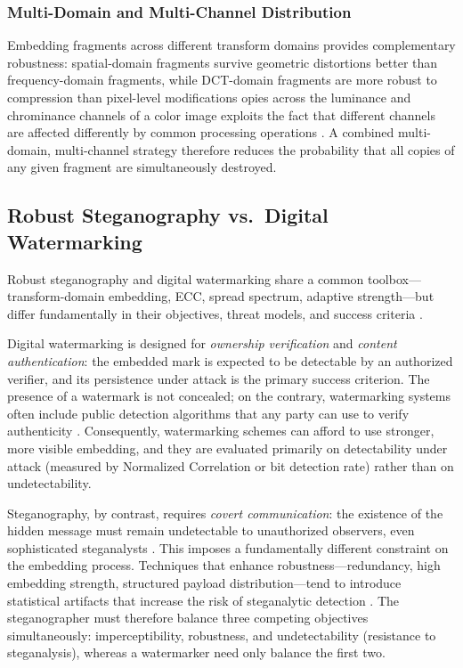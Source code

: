 \documentclass[12pt,a4paper,oneside]{report}
\begin{document}
	\subsubsection{Multi-Domain and Multi-Channel Distribution}
	
	Embedding fragments across different transform domains provides complementary robustness:
	spatial-domain fragments survive geometric distortions better than frequency-domain
	fragments, while DCT-domain fragments are more robust to compression than pixel-level
	modifications \cite{Piva2002, petitcolas1999information}opies across the luminance and chrominance channels
	of a color image exploits the fact that different channels are affected differently
	by common processing operations \cite{barni2001improved}.
	A combined multi-domain, multi-channel strategy therefore reduces the probability that
	all copies of any given fragment are simultaneously destroyed.
	
	\subsection{Robust Steganography vs.\ Digital Watermarking}
	\label{subsec:stego_vs_watermark}
	
	Robust steganography and digital watermarking share a common toolbox—transform-domain
	embedding, ECC, spread spectrum, adaptive strength—but differ fundamentally in their
	objectives, threat models, and success criteria \cite{cox2007, johnson1998steganography}.
	
	Digital watermarking is designed for \emph{ownership verification} and
	\emph{content authentication}: the embedded mark is expected to be detectable by an
	authorized verifier, and its persistence under attack is the primary success criterion.
	The presence of a watermark is not concealed; on the contrary, watermarking systems
	often include public detection algorithms that any party can use to verify authenticity
	\cite{petitcolas1999information}.
	Consequently, watermarking schemes can afford to use stronger, more visible embedding,
	and they are evaluated primarily on detectability under attack (measured by Normalized
	Correlation or bit detection rate) rather than on undetectability.
	
	Steganography, by contrast, requires \emph{covert communication}: the existence of the
	hidden message must remain undetectable to unauthorized observers, even sophisticated
	steganalysts \cite{provos2003hide, johnson1998exploring}.
	This imposes a fundamentally different constraint on the embedding process.
	Techniques that enhance robustness—redundancy, high embedding strength, structured payload
	distribution—tend to introduce statistical artifacts that increase the risk of steganalytic
	detection \cite{Fridrich2012}.
	The steganographer must therefore balance three competing objectives simultaneously:
	imperceptibility, robustness, and undetectability (resistance to steganalysis), whereas
	a watermarker need only balance the first two.
	
\end{document}
